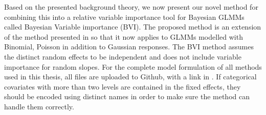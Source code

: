 Based on the presented background theory, we now present our novel method for combining this into a relative variable importance tool for Bayesian GLMMs called Bayesian Variable importance (BVI). The proposed method is an extension of the method presented in \citet{Arnstad:Relative_variable_importance_in_Bayesian_linear_mixed_models:2024} so that it now applies to GLMMs modelled with Binomial, Poisson in addition to Gaussian responses. The BVI method assumes the distinct random effects to be independent and does not include variable importance for random slopes.
\newline
\newline
For the complete model formulation of all methods used in this thesis, all files are uploaded to Github, with a link in . 
If categorical covariates with more than two levels are contained in the fixed effects, they should be encoded using distinct names in order to make sure the method can handle them correctly.
